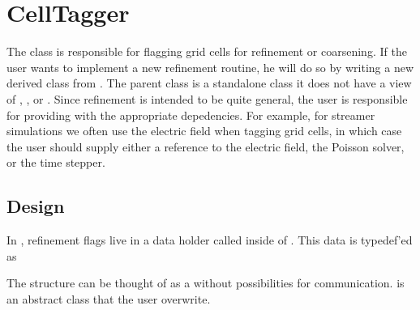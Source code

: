 \documentclass[letterpaper,10pt,english]{sphinxmanual}
\begin{document}
\section{CellTagger}
\label{\detokenize{Source/CellTagger:celltagger}}\label{\detokenize{Source/CellTagger:chap-celltagger}}\label{\detokenize{Source/CellTagger::doc}}
The  class is responsible for flagging grid cells for refinement or coarsening.
If the user wants to implement a new refinement routine, he will do so by writing a new derived class from .
The  parent class is a stand\sphinxhyphen{}alone class \sphinxhyphen{} it does not have a view of , , or .
Since refinement is intended to be quite general, the user is responsible for providing  with the appropriate depedencies.
For example, for streamer simulations we often use the electric field when tagging grid cells, in which case the user should supply either a reference to the electric field, the Poisson solver, or the time stepper.


\subsection{Design}
\label{\detokenize{Source/CellTagger:design}}
In , refinement flags live in a data holder called  inside of .
This data is typedef’ed as

\begin{sphinxVerbatim}[commandchars=\\\{\},formatcom=\scriptsize]
    
\end{sphinxVerbatim}

The  structure can be thought of as a  without possibilities for communication.
 is an abstract class that the user  overwrite.
\end{document}
